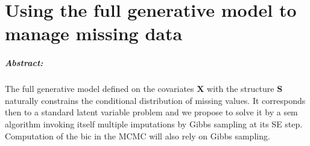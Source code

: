 \documentclass[12pt,a4paper]{report}
\begin{document}
\chapter{Using the full generative model to manage missing data} \label{chapmiss}
	\paragraph{Abstract:} The full generative model defined on the covariates $\boldsymbol{X}$ with the structure $\boldsymbol{S}$ naturally constrains the conditional distribution of missing values. 
	It corresponds then to a standard latent variable problem and
	we propose to solve it by a {\sc sem} algorithm invoking itself multiple imputations by Gibbs sampling at its SE step. Computation of the {\sc bic} in the MCMC will also rely on Gibbs sampling. 
	
	
\end{document}
